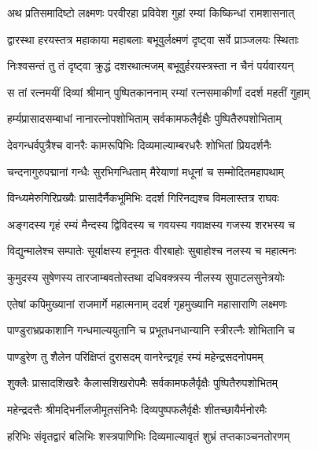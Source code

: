 
\twolineshloka
{अथ प्रतिसमादिष्टो लक्ष्मणः परवीरहा}
{प्रविवेश गुहां रम्यां किष्किन्धां रामशासनात्} %

\twolineshloka
{द्वारस्था हरयस्तत्र महाकाया महाबलाः}
{बभूवुर्लक्ष्मणं दृष्ट्वा सर्वे प्राञ्जलयः स्थिताः} %

\twolineshloka
{निःश्वसन्तं तु तं दृष्ट्वा क्रुद्धं दशरथात्मजम्}
{बभूवुर्हरयस्त्रस्ता न चैनं पर्यवारयन्} %

\twolineshloka
{स तां रत्नमयीं दिव्यां श्रीमान् पुष्पितकाननाम्}
{रम्यां रत्नसमाकीर्णां ददर्श महतीं गुहाम्} %

\twolineshloka
{हर्म्यप्रासादसम्बाधां नानारत्नोपशोभिताम्}
{सर्वकामफलैर्वृक्षैः पुष्पितैरुपशोभिताम्} %

\twolineshloka
{देवगन्धर्वपुत्रैश्च वानरैः कामरूपिभिः}
{दिव्यमाल्याम्बरधरैः शोभितां प्रियदर्शनैः} %

\twolineshloka
{चन्दनागुरुपद्मानां गन्धैः सुरभिगन्धिताम्}
{मैरेयाणां मधूनां च सम्मोदितमहापथाम्} %

\twolineshloka
{विन्ध्यमेरुगिरिप्रख्यैः प्रासादैर्नैकभूमिभिः}
{ददर्श गिरिनद्यश्च विमलास्तत्र राघवः} %

\twolineshloka
{अङ्गदस्य गृहं रम्यं मैन्दस्य द्विविदस्य च}
{गवयस्य गवाक्षस्य गजस्य शरभस्य च} %

\twolineshloka
{विद्युन्मालेश्च सम्पातेः सूर्याक्षस्य हनूमतः}
{वीरबाहोः सुबाहोश्च नलस्य च महात्मनः} %

\twolineshloka
{कुमुदस्य सुषेणस्य तारजाम्बवतोस्तथा}
{दधिवक्त्रस्य नीलस्य सुपाटलसुनेत्रयोः} %

\twolineshloka
{एतेषां कपिमुख्यानां राजमार्गे महात्मनाम्}
{ददर्श गृहमुख्यानि महासाराणि लक्ष्मणः} %

\twolineshloka
{पाण्डुराभ्रप्रकाशानि गन्धमाल्ययुतानि च}
{प्रभूतधनधान्यानि स्त्रीरत्नैः शोभितानि च} %

\twolineshloka
{पाण्डुरेण तु शैलेन परिक्षिप्तं दुरासदम्}
{वानरेन्द्रगृहं रम्यं महेन्द्रसदनोपमम्} %

\twolineshloka
{शुक्लैः प्रासादशिखरैः कैलासशिखरोपमैः}
{सर्वकामफलैर्वृक्षैः पुष्पितैरुपशोभितम्} %

\twolineshloka
{महेन्द्रदत्तैः श्रीमद्भिर्नीलजीमूतसंनिभैः}
{दिव्यपुष्पफलैर्वृक्षैः शीतच्छायैर्मनोरमैः} %

\twolineshloka
{हरिभिः संवृतद्वारं बलिभिः शस्त्रपाणिभिः}
{दिव्यमाल्यावृतं शुभ्रं तप्तकाञ्चनतोरणम्} %

